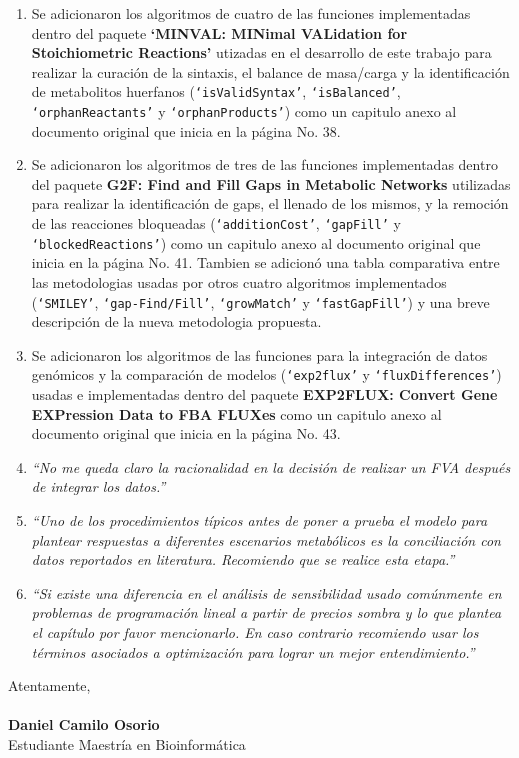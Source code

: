 \documentclass[11pt,a4paper]{article}
\begin{document}
\begin{enumerate}
\item Se adicionaron los algoritmos de cuatro de las  funciones implementadas dentro del paquete \textbf{`MINVAL: MINimal VALidation for Stoichiometric Reactions'} utizadas en el desarrollo de este trabajo para realizar la curación de la sintaxis, el balance de masa/carga y  la identificación de metabolitos huerfanos (\texttt{`isValidSyntax'}, \texttt{`isBalanced'}, \texttt{`orphanReactants'} y \texttt{`orphanProducts'}) como un capitulo anexo al documento original que inicia en la página No. 38.

\item Se adicionaron los algoritmos de tres de las funciones implementadas dentro del paquete \textbf{G2F: Find and Fill Gaps in Metabolic Networks} utilizadas para realizar la identificación de gaps, el llenado de los mismos, y la remoción de las reacciones bloqueadas (\texttt{`additionCost'}, \texttt{`gapFill'} y \texttt{`blockedReactions'}) como un capitulo anexo al documento original que inicia en la página No. 41. Tambien se adicionó una tabla comparativa entre las metodologias usadas por otros cuatro algoritmos implementados (\texttt{`SMILEY'}, \texttt{`gap-Find/Fill'}, \texttt{`growMatch'} y \texttt{`fastGapFill'}) y una breve descripción de la nueva metodologia propuesta.

\item Se adicionaron los algoritmos de las funciones para la integración de datos genómicos y la comparación de modelos  (\texttt{`exp2flux'} y \texttt{`fluxDifferences'}) usadas e implementadas dentro del paquete \textbf{EXP2FLUX: Convert Gene EXPression Data to FBA FLUXes} como un capitulo anexo al documento original que inicia en la página No. 43.

\item \emph{``No me queda claro la racionalidad en la decisión de realizar un FVA después de integrar los datos.''}

\item \emph{``Uno de los procedimientos típicos antes de poner a prueba el modelo para plantear respuestas a diferentes escenarios metabólicos es la conciliación con datos reportados en literatura. Recomiendo que se realice esta etapa.''}

\item \emph{``Si existe una diferencia en el análisis de sensibilidad usado comúnmente en problemas de programación lineal a partir de precios sombra y lo que plantea el capítulo por favor mencionarlo. En caso contrario recomiendo usar los términos asociados a optimización para lograr un mejor entendimiento.''}

\end{enumerate}
Atentamente,\\
\\
\textbf{Daniel Camilo Osorio}\\
Estudiante Maestría en Bioinformática
\end{document}
